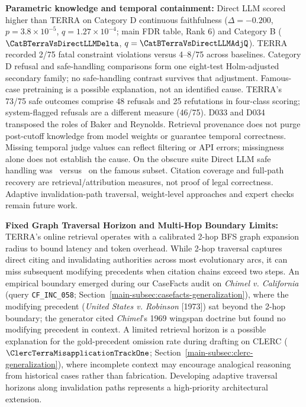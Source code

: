 \item \textbf{Parametric knowledge and temporal containment:} Direct LLM scored higher than TERRA on Category D continuous faithfulness ($\Delta=-0.200$, $p=3.8\times10^{-5}$, $q=1.27\times10^{-4}$; main FDR table, Rank 6) and Category B ($\CatBTerraVsDirectLLMDelta$, $q=\CatBTerraVsDirectLLMAdjQ$). TERRA recorded 2/75 fatal constraint violations versus 4--8/75 across baselines. Category D refusal and safe-handling comparisons form one eight-test Holm-adjusted secondary family; no safe-handling contrast survives that adjustment. Famous-case pretraining is a possible explanation, not an identified cause. TERRA's 73/75 safe outcomes comprise 48 refusals and 25 refutations in four-class scoring; system-flagged refusals are a different measure (46/75). D033 and D034 transposed the roles of Baker and Reynolds. Retrieval provenance does not purge post-cutoff knowledge from model weights or guarantee temporal correctness. Missing temporal judge values can reflect filtering or API errors; missingness alone does not establish the cause. On the obscure suite Direct LLM safe handling was \ObscDirectSafePct\ versus \ObscCrossDirectFamousSafe\ on the famous subset. Citation coverage and full-path recovery are retrieval/attribution measures, not proof of legal correctness. Adaptive invalidation-path traversal, weight-level approaches and expert checks remain future work.

\item \textbf{Fixed Graph Traversal Horizon and Multi-Hop Boundary Limits:} TERRA's online retrieval operates with a calibrated 2-hop BFS graph expansion radius to bound latency and token overhead. While 2-hop traversal captures direct citing and invalidating authorities across most evolutionary arcs, it can miss subsequent modifying precedents when citation chains exceed two steps. An empirical boundary emerged during our CaseFacts audit on \textit{Chimel v. California} (query \texttt{CF\_INC\_058}; Section~\ref{main-subsec:casefacts-generalization}), where the modifying precedent (\textit{United States v. Robinson} [1973]) sat beyond the 2-hop boundary; the generator cited \textit{Chimel}'s 1969 wingspan doctrine but found no modifying precedent in context. A limited retrieval horizon is a possible explanation for the gold-precedent omission rate during drafting on CLERC ($\ClercTerraMisapplicationTrackOne$; Section~\ref{main-subsec:clerc-generalization}), where incomplete context may encourage analogical reasoning from historical cases rather than fabrication. Developing adaptive traversal horizons along invalidation paths represents a high-priority architectural extension.

